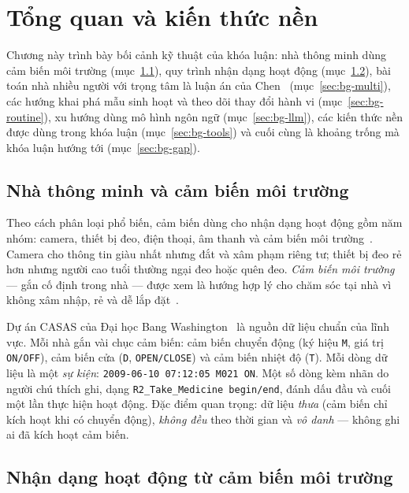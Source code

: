 \chapter{Tổng quan và kiến thức nền}
\label{chap:background}

Chương này trình bày bối cảnh kỹ thuật của khóa luận: nhà thông minh dùng cảm biến môi trường
(mục~\ref{sec:bg-smarthome}), quy trình nhận dạng hoạt động (mục~\ref{sec:bg-har}), bài toán nhà
nhiều người với trọng tâm là luận án của Chen~\cite{chen2021thesis} (mục~\ref{sec:bg-multi}),
các hướng khai phá mẫu sinh hoạt và theo dõi thay đổi hành vi (mục~\ref{sec:bg-routine}), xu hướng
dùng mô hình ngôn ngữ (mục~\ref{sec:bg-llm}), các kiến thức nền được dùng trong khóa luận
(mục~\ref{sec:bg-tools}) và cuối cùng là khoảng trống mà khóa luận hướng tới
(mục~\ref{sec:bg-gap}).

\section{Nhà thông minh và cảm biến môi trường}
\label{sec:bg-smarthome}

Theo cách phân loại phổ biến, cảm biến dùng cho nhận dạng hoạt động gồm năm nhóm: camera, thiết bị
đeo, điện thoại, âm thanh và cảm biến môi trường~\cite{chen2021thesis,bouchabou2021survey}. Camera
cho thông tin giàu nhất nhưng đắt và xâm phạm riêng tư; thiết bị đeo rẻ hơn nhưng người cao tuổi
thường ngại đeo hoặc quên đeo. \emph{Cảm biến môi trường} --- gắn cố định trong nhà --- được xem là
hướng hợp lý cho chăm sóc tại nhà vì không xâm nhập, rẻ và dễ lắp đặt~\cite{chen2021thesis}.

Dự án CASAS của Đại học Bang Washington~\cite{cook2013casas} là nguồn dữ liệu chuẩn của lĩnh vực.
Mỗi nhà gắn vài chục cảm biến: cảm biến chuyển động (ký hiệu \texttt{M}, giá trị \texttt{ON/OFF}),
cảm biến cửa (\texttt{D}, \texttt{OPEN/CLOSE}) và cảm biến nhiệt độ (\texttt{T}). Mỗi dòng dữ liệu
là một \emph{sự kiện}: \texttt{2009-06-10 07:12:05 M021 ON}. Một số dòng kèm nhãn do người chú
thích ghi, dạng \texttt{R2\_Take\_Medicine begin/end}, đánh dấu đầu và cuối một lần thực hiện hoạt
động. Đặc điểm quan trọng: dữ liệu \emph{thưa} (cảm biến chỉ kích hoạt khi có chuyển động),
\emph{không đều} theo thời gian và \emph{vô danh} --- không ghi ai đã kích hoạt cảm biến.

\section{Nhận dạng hoạt động từ cảm biến môi trường}
\label{sec:bg-har}

